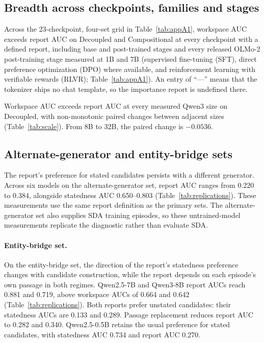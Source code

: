\subsection{Breadth across checkpoints, families and stages}
\label{app:breadth}

Across the 23-checkpoint, four-set grid in Table~\ref{tab:appA1},
workspace AUC exceeds report AUC on Decoupled and Compositional at
every checkpoint with a defined report, including base and post-trained
stages and every released OLMo-2 post-training stage measured at 1B and
7B (supervised fine-tuning (SFT), direct preference optimization (DPO)
where available, and reinforcement learning with verifiable rewards
(RLVR); Table~\ref{tab:appA1}).
An entry of ``---'' means that the tokenizer ships no chat template,
so the importance report is undefined there.



Workspace AUC exceeds report AUC at every measured Qwen3 size on
Decoupled, with non-monotonic paired changes between adjacent sizes
(Table~\ref{tab:scale}). From 8B to 32B, the paired change is $-0.0536$.




\subsection{Alternate-generator and entity-bridge sets}
\label{app:replications}

The report's preference for stated candidates persists with a different
generator. Across six models on the alternate-generator set,
report AUC ranges from 0.220 to 0.384, alongside statedness AUC
0.650--0.803 (Table~\ref{tab:replications}). These measurements use
the same report definition as the primary sets. The alternate-generator
set also supplies SDA training episodes, so these untrained-model
measurements replicate the diagnostic rather than evaluate SDA.



\paragraph{Entity-bridge set.}
On the entity-bridge set, the direction of the report's statedness
preference changes with candidate construction, while the report depends
on each episode's own passage in both regimes. Qwen2.5-7B and Qwen3-8B
report AUCs reach 0.881 and 0.719, above workspace AUCs of 0.664 and
0.642 (Table~\ref{tab:replications}). Both reports prefer unstated
candidates: their statedness AUCs are 0.133 and 0.289. Passage replacement
reduces report AUC to 0.282 and 0.340. Qwen2.5-0.5B retains the usual
preference for stated candidates, with statedness AUC 0.734 and report
AUC 0.270.


